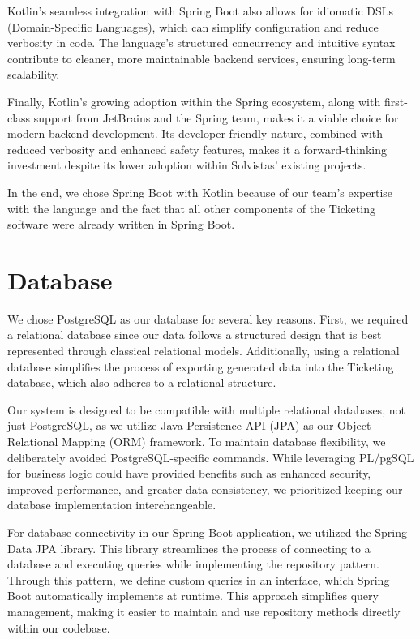 Kotlin’s seamless integration with Spring Boot also allows for idiomatic DSLs (Domain-Specific Languages), which can simplify configuration and reduce verbosity in code. The language’s structured concurrency and intuitive syntax contribute to cleaner, more maintainable backend services, ensuring long-term scalability.

Finally, Kotlin’s growing adoption within the Spring ecosystem, along with first-class support from JetBrains and the Spring team, makes it a viable choice for modern backend development. Its developer-friendly nature, combined with reduced verbosity and enhanced safety features, makes it a forward-thinking investment despite its lower adoption within Solvistas’ existing projects.

In the end, we chose Spring Boot with Kotlin because of our team’s expertise with the language and the fact that all other components of the Ticketing software were already written in Spring Boot.

\section{Database}
We chose PostgreSQL as our database for several key reasons. First, we required a relational database since our data follows a structured design that is best represented through classical relational models. Additionally, using a relational database simplifies the process of exporting generated data into the Ticketing database, which also adheres to a relational structure.

Our system is designed to be compatible with multiple relational databases, not just PostgreSQL, as we utilize Java Persistence API (JPA) as our Object-Relational Mapping (ORM) framework. To maintain database flexibility, we deliberately avoided PostgreSQL-specific commands. While leveraging PL/pgSQL for business logic could have provided benefits such as enhanced security, improved performance, and greater data consistency, we prioritized keeping our database implementation interchangeable.

For database connectivity in our Spring Boot application, we utilized the Spring Data JPA library. This library streamlines the process of connecting to a database and executing queries while implementing the repository pattern. Through this pattern, we define custom queries in an interface, which Spring Boot automatically implements at runtime. This approach simplifies query management, making it easier to maintain and use repository methods directly within our codebase.

